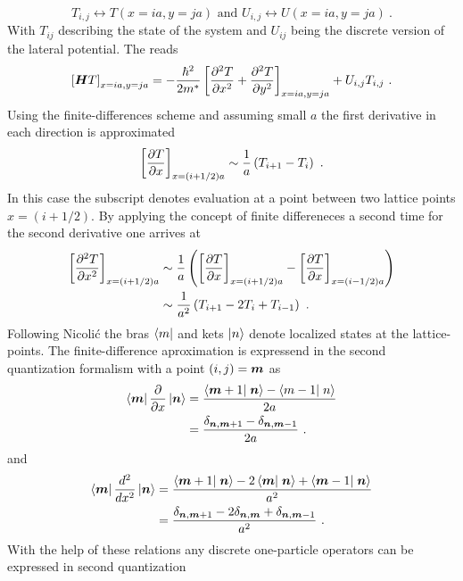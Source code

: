 \begin{equation}
  T_{i,j} \leftrightarrow T(x=ia,y=ja) \mbox{ and } U_{i,j}\leftrightarrow U(x=ia,y=ja)\ .
  \label{FunctionDescrete}
\end{equation}
With $T_{ij}$ describing the state of the system and $U_{ij}$ being the discrete version of the lateral potential.
The \hamil{} reads
\begin{equation}
  \left[\v{H}T\right]_{x=ia,y=ja}=-\frac{\hbar^{2}}{2m^*}\left[\pdd{T}{x}+\pdd{T}{y}\right]_{x=ia,y=ja}+U_{i,j}T_{i,j}\ .
  \label{DiscreteHamil}
\end{equation}
Using the finite-differences scheme and assuming small $a$ the first derivative in each direction is approximated 
\begin{equation}
  \left[\frac{\partial T}{\partial x}\right]_{x=(i+1/2)a} \sim  \frac{1}{a}\left(T_{i+1}-T_{i}\right)\ .
  \label{ApproximateFirstDerivative}
\end{equation}
In this case the subscript denotes evaluation at a point between two lattice points $x=(i+1/2)$. By applying the concept of finite differeneces a second time for the second derivative one arrives at
\begin{align}
  \left[\frac{\partial^2 T}{\partial x^2}\right]_{x=(i+1/2)a} &\sim \frac{1}{a}\left( \left[\frac{\partial T}{\partial x}\right]_{x=(i+1/2)a}-\left[\frac{\partial T}{\partial x}\right]_{x=(i-1/2)a} \right) \notag \\
  &\sim \frac{1}{a^2}\left(T_{i+1}-2T_{i}+T_{i-1}\right)\ .
  \label{ApproximateSecondDerivative}
\end{align}
Following Nicoli\'c \cite{Nikolic2010} the bras $\left< m \right|$ and kets $\left| n \right>$ denote localized states at the lattice-points. The finite-difference aproximation is  expressend in the second quantization formalism with a point $(i,j) = \boldsymbol{m}$ as
\begin{align}
	\bra{\v{m}} \pd{}{x} \ket{\v{n}} &= \frac{\braket{\v{m}+1}{\v{n}}-\braket{m-1}{n}}{2a}\notag\\ 
				&= \frac{\delta_{\v{n},\v{m}+1}-\delta_{\v{n},\v{m}-1}}{2a}\ .
	\label{eqn:finitedifffirstderivative}
\end{align}
and
\begin{align}
	\bra{\v{m}} \dd{}{x} \ket{\v{n}} &= \frac{\braket{\v{m}+1}{\v{n}}-2\braket{\v{m}}{\v{n}}+\braket{\v{m}-1}{\v{n}}}{a^2} \\
				 &= \frac{\delta_{\v{n},\v{m}+1}-2\delta_{\v{n},\v{m}}+\delta_{\v{n},\v{m}-1}}{a^2}\ .
	\label{eqn:finitediffsecondderivative}
\end{align}
With the help of these relations any discrete one-particle operators can be expressed in second quantization
